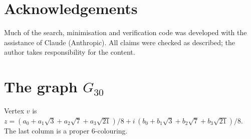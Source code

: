 \documentclass[11pt,a4paper]{amsart}
\theoremstyle{remark}
\begin{document}
\section*{Acknowledgements}
Much of the search, minimisation and verification code was developed with the assistance of Claude (Anthropic). All claims were checked as described; the author takes responsibility for the content.




\appendix
\section{The graph $G_{30}$}\label{app:g30}

Vertex $v$ is $z=(a_0+a_1\sqrt3+a_2\sqrt7+a_3\sqrt{21})/8+i\,(b_0+b_1\sqrt3+b_2\sqrt7+b_3\sqrt{21})/8$. The last column is a proper $6$-colouring.
\end{document}
